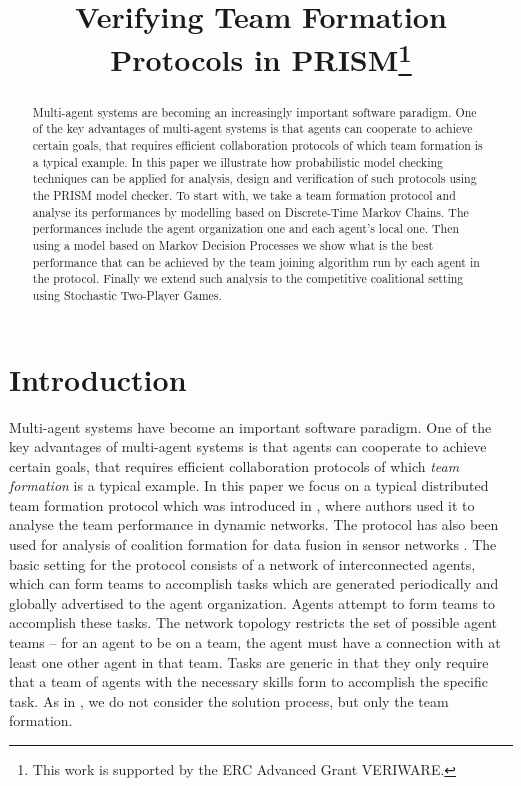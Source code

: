 \documentclass{llncs}
\newcommand{\comment}[1]{{\color{red}{[\sf #1]}}}
\begin{document}
\title{Verifying Team Formation Protocols in PRISM\thanks{This work is supported by
the ERC Advanced Grant VERIWARE.}}
\author{}
\email{}

\maketitle

\begin{abstract}
Multi-agent systems are becoming an increasingly important software paradigm. One of the key advantages of multi-agent systems is that agents can cooperate to achieve certain goals, that requires efficient collaboration protocols of which team formation is a typical example. In this paper we illustrate how probabilistic model checking techniques can be applied for analysis, design and verification of such protocols using the PRISM model checker. To start with, we take a team formation protocol and analyse its performances by modelling based on Discrete-Time Markov Chains. The performances include the agent organization one and each agent's local one. Then using a model based on Markov Decision Processes we show what is the best performance that can be achieved by the team joining algorithm run by each agent in the protocol. Finally we extend such analysis to the competitive coalitional setting using Stochastic Two-Player Games.
\end{abstract}

\section{Introduction}

\comment{will need a high-level description of PMC in intro, so put this here. Add some comments about complexity}
%

Multi-agent systems have become an important software paradigm. One of the key advantages of multi-agent systems is that agents can cooperate to achieve certain goals, that requires efficient collaboration protocols of which \emph{team formation} is a typical example. In this paper we focus on a typical distributed team formation protocol which was introduced in \cite{gaston2005agent}, where authors used it to analyse the team performance in dynamic networks. The protocol %
has also been used for analysis of coalition formation for data fusion in sensor networks \cite{glinton2008agent}. The basic setting for the protocol consists of a network of interconnected agents, which can form teams to accomplish tasks which are generated periodically and globally advertised to the agent organization. Agents attempt to form teams to accomplish these tasks. The network topology restricts the set of possible agent teams -- for an agent to be on a team, the agent must have a connection with at least one other agent in that team. Tasks are generic in that they only require that a team of agents with the necessary skills form to accomplish the specific task. As in \cite{gaston2005agent}, we do not consider the solution process, but only the team formation.
\end{document}
